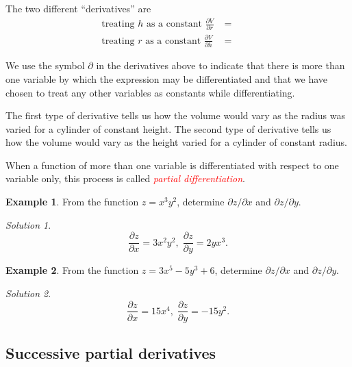 \documentclass[
  11pt,
  oneside]{book}
\newcommand{\slide}{}
\theoremstyle{definition}
\theoremstyle{definition}
\newtheorem{example}{Example}[chapter]
\theoremstyle{definition}
\theoremstyle{definition}
\theoremstyle{remark}
\newtheorem*{solution}{Solution}
\begin{document}
\begin{slidesonly}

The two different ``derivatives'' are
\begin{align*}
\text{treating }h\text{ as a constant } \frac{\partial V}{\partial r} &= \phantom{2\pi rh}\\
\text{treating }r\text{ as a constant } \frac{\partial V}{\partial h} &= \phantom{\pi r^2}
\end{align*}
\slide

\end{slidesonly}

We use the symbol \(\partial\) in the derivatives above to indicate that there is more than one variable by which the expression may be differentiated and that we have chosen to treat any other variables as constants while differentiating.

The first type of derivative tells us how the volume would vary as the radius was varied for a cylinder of constant height. The second type of derivative tells us how the volume would vary as the height varied for a cylinder of constant radius.

When a function of more than one variable is differentiated with respect to one variable only, this process is called \textcolor{red}{\em partial differentiation}.

\slide

\begin{example}
From the function \(z=x^3y^2\), determine \(\partial z/\partial x\) and \(\partial z/\partial y\).
\end{example}

\begin{solution}
\[
\frac{\partial z}{\partial x} = 3x^2y^2,\;\frac{\partial z}{\partial y} = 2yx^3.
\]
\end{solution}

\slide

\begin{example}
From the function \(z=3x^5-5y^3+6\), determine \(\partial z/\partial x\) and \(\partial z/\partial y\).
\end{example}

\begin{solution}
\[
\frac{\partial z}{\partial x} = 15x^4,\;\frac{\partial z}{\partial y} = -15y^2.
\]
\end{solution}

\slide

\subsection{Successive partial derivatives}\label{successive-partial-derivatives}
\end{document}
